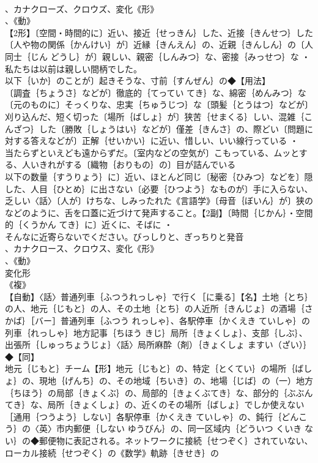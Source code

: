 \documentclass[8pt]{extreport}
\begin{document}
\begin{CJK}{UTF8}{min}
\\	、カナクローズ、クロウズ、変化《形》
\\	、《動》
\\	【2形】〔空間・時間的に〕近い、接近｛せっきん｝した、近接｛きんせつ｝した〔人や物の関係｛かんけい｝が〕近縁｛きんえん｝の、近親｛きんしん｝の〔人同士｛じん どうし｝が〕親しい、親密｛しんみつ｝な、密接｛みっせつ｝な ・
\\	私たちは以前は親しい間柄でした。
\\	以下｛いか｝のことが〕起きそうな、寸前｛すんぜん｝の◆【用法】
\\	〔調査｛ちょうさ｝などが〕徹底的｛てってい てき｝な、綿密｛めんみつ｝な〔元のものに〕そっくりな、忠実｛ちゅうじつ｝な〔頭髪｛とうはつ｝などが〕刈り込んだ、短く切った〔場所｛ばしょ｝が〕狭苦｛せまくる｝しい、混雑｛こんざつ｝した〔勝敗｛しょうはい｝などが〕僅差｛きんさ｝の、際どい〔問題に対する答えなどが〕正解｛せいかい｝に近い、惜しい、いい線行っている ・
\\	当たらずといえども遠からずだ。〔室内などの空気が〕こもっている、ムッとする、人いきれがする〔織物｛おりもの｝の〕目が詰んでいる
\\	以下の数量｛すうりょう｝に〕近い、ほとんど同じ〔秘密｛ひみつ｝などを〕隠した、人目｛ひとめ｝に出さない〔必要｛ひつよう｝なものが〕手に入らない、乏しい〈話〉〔人が〕けちな、しみったれた《言語学》〔母音｛ぼいん｝が〕狭の
\\	などのように、舌を口蓋に近づけて発声すること。【2副】〔時間｛じかん｝・空間的｛くうかん てき｝に〕近くに、そばに ・
\\	そんなに近寄らないでください。びっしりと、ぎっちりと発音
\\	、カナクロース、クロウス、変化《形》
\\	、《動》
\\	変化形 
\\	《複》
\\	【自動】〈話〉普通列車｛ふつうれっしゃ｝で行く［に乗る］【名】土地｛とち｝の人、地元｛じもと｝の人、その土地｛とち｝の人近所｛きんじょ｝の酒場｛さかば｝［バー］普通列車｛ふつう れっしゃ｝、各駅停車｛かくえき ていしゃ｝の列車｛れっしゃ｝地方記事｛ちほう きじ｝局所｛きょくしょ｝、支部｛しぶ｝、出張所｛しゅっちょうじょ｝〈話〉局所麻酔（剤）｛きょくしょ ますい（ざい）｝◆【同】
\\	地元｛じもと｝チーム【形】地元｛じもと｝の、特定｛とくてい｝の場所｛ばしょ｝の、現地｛げんち｝の、その地域｛ちいき｝の、地場｛じば｝の（一）地方｛ちほう｝の局部｛きょくぶ｝の、局部的｛きょくぶてき｝な、部分的｛ぶぶんてき｝な、局所｛きょくしょ｝の、近くのその場所｛ばしょ｝でしか使えない［通用｛つうよう｝しない］各駅停車｛かくえき ていしゃ｝の、鈍行｛どんこう｝の〈英〉市内郵便｛しない ゆうびん｝の、同一区域内｛どういつ くいき ない｝の◆郵便物に表記される。ネットワークに接続｛せつぞく｝されていない、ローカル接続｛せつぞく｝の《数学》軌跡｛きせき｝の

\end{CJK}
\end{document}
